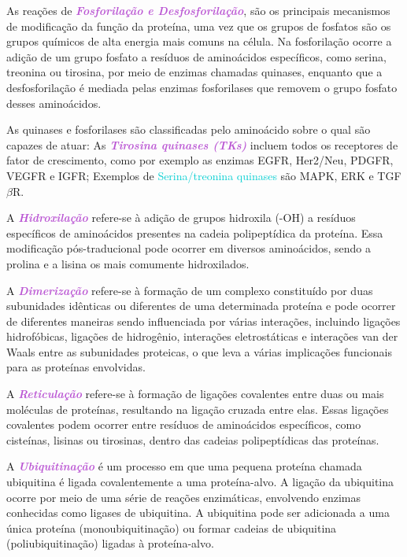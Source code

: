 \documentclass[11pt,a4paper]{article}
\newcounter{exemplo}
\begin{document}
	As reações de \textcolor{MediumOrchid}{\textbf{\textit{Fosforilação e Desfosforilação}}}, são os principais mecanismos de modificação da função da proteína, uma vez que os grupos de fosfatos são os grupos químicos de alta energia mais comuns na célula. Na fosforilação ocorre a adição de um grupo fosfato a resíduos de aminoácidos específicos, como serina, treonina ou tirosina, por meio de enzimas chamadas quinases, enquanto que a desfosforilação é mediada pelas enzimas fosforilases que removem o grupo fosfato desses aminoácidos.

	As quinases e fosforilases são classificadas pelo aminoácido sobre o qual são capazes de atuar: As \textcolor{MediumOrchid}{\textbf{\textit{Tirosina quinases (TKs)}}} incluem todos os receptores de fator de crescimento, como por exemplo as enzimas EGFR, Her2/Neu, PDGFR, VEGFR e IGFR; Exemplos de \textcolor{DarkTurquoise}{Serina/treonina quinases} são MAPK, ERK e TGF$\beta$R.

	A \textcolor{MediumOrchid}{\textbf{\textit{Hidroxilação}}} refere-se à adição de grupos hidroxila (-OH) a resíduos específicos de aminoácidos presentes na cadeia polipeptídica da proteína. Essa modificação pós-traducional pode ocorrer em diversos aminoácidos, sendo a prolina e a lisina os mais comumente hidroxilados.

	A \textcolor{MediumOrchid}{\textbf{\textit{Dimerização}}} refere-se à formação de um complexo constituído por duas subunidades idênticas ou diferentes de uma determinada proteína e pode ocorrer de diferentes maneiras sendo influenciada por várias interações, incluindo ligações hidrofóbicas, ligações de hidrogênio, interações eletrostáticas e interações van der Waals entre as subunidades proteicas, o que leva a várias implicações funcionais para as proteínas envolvidas.

	A \textcolor{MediumOrchid}{\textbf{\textit{Reticulação}}} refere-se à formação de ligações covalentes entre duas ou mais moléculas de proteínas, resultando na ligação cruzada entre elas. Essas ligações covalentes podem ocorrer entre resíduos de aminoácidos específicos, como cisteínas, lisinas ou tirosinas, dentro das cadeias polipeptídicas das proteínas. 

	A \textcolor{MediumOrchid}{\textbf{\textit{Ubiquitinação}}} é um processo em que uma pequena proteína chamada ubiquitina é ligada covalentemente a uma proteína-alvo. A ligação da ubiquitina ocorre por meio de uma série de reações enzimáticas, envolvendo enzimas conhecidas como ligases de ubiquitina. A ubiquitina pode ser adicionada a uma única proteína (monoubiquitinação) ou formar cadeias de ubiquitina (poliubiquitinação) ligadas à proteína-alvo. 
\end{document}
